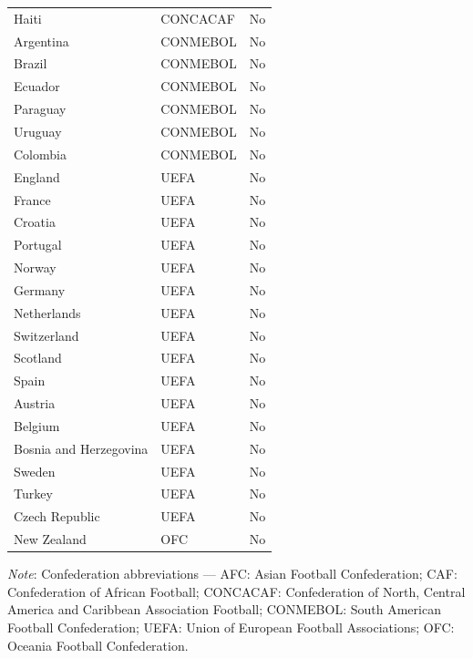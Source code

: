 \documentclass[12pt]{article}
\begin{document}
\begin{longtable}{llc}
Haiti          & CONCACAF & No \\
Argentina      & CONMEBOL & No \\
Brazil         & CONMEBOL & No \\
Ecuador        & CONMEBOL & No \\
Paraguay       & CONMEBOL & No \\
Uruguay        & CONMEBOL & No \\
Colombia       & CONMEBOL & No \\
England        & UEFA & No \\
France         & UEFA & No \\
Croatia        & UEFA & No \\
Portugal       & UEFA & No \\
Norway         & UEFA & No \\
Germany        & UEFA & No \\
Netherlands    & UEFA & No \\
Switzerland    & UEFA & No \\
Scotland       & UEFA & No \\
Spain          & UEFA & No \\
Austria        & UEFA & No \\
Belgium        & UEFA & No \\
Bosnia and Herzegovina & UEFA & No \\
Sweden         & UEFA & No \\
Turkey         & UEFA & No \\
Czech Republic & UEFA & No \\
New Zealand    & OFC & No \\
\end{longtable}

\noindent\small
\textit{Note}: Confederation abbreviations --- AFC: Asian Football
Confederation; CAF: Confederation of African Football; CONCACAF:
Confederation of North, Central America and Caribbean Association
Football; CONMEBOL: South American Football Confederation; UEFA:
Union of European Football Associations; OFC: Oceania Football
Confederation.



\end{document}
